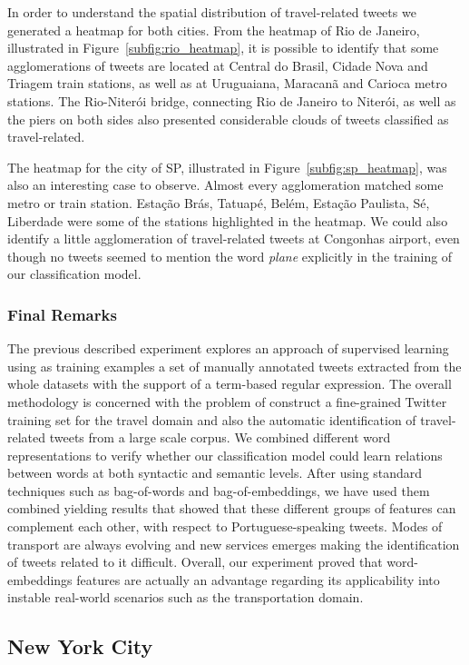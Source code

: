 In order to understand the spatial distribution of travel-related tweets we generated a heatmap for both cities. From the heatmap of Rio de Janeiro, illustrated in Figure~\ref{subfig:rio_heatmap}, it is possible to identify that some agglomerations of tweets are located at Central do Brasil, Cidade Nova and Triagem train stations, as well as at Uruguaiana, Maracanã and Carioca metro stations. The Rio-Niterói bridge, connecting Rio de Janeiro to Niterói, as well as the piers on both sides also presented considerable clouds of tweets classified as travel-related.

The heatmap for the city of SP, illustrated in Figure~\ref{subfig:sp_heatmap}, was also an interesting case to observe. Almost every agglomeration matched some metro or train station. Estação Brás, Tatuapé, Belém, Estação Paulista, Sé, Liberdade were some of the stations highlighted in the heatmap. We could also identify a little agglomeration of travel-related tweets at Congonhas airport, even though no tweets seemed to mention the word \textit{plane} explicitly in the training of our classification model.

\subsubsection{Final Remarks}
The previous described experiment explores an approach of supervised learning using as training examples a set of manually annotated tweets extracted from the whole datasets with the support of a term-based regular expression. The overall methodology is concerned with the problem of construct a fine-grained Twitter training set for the travel domain and also the automatic identification of travel-related tweets from a large scale corpus. We combined different word representations to verify whether our classification model could learn relations between words at both syntactic and semantic levels. After using standard techniques such as bag-of-words and bag-of-embeddings, we have used them combined yielding results that showed that these different groups of features can complement each other, with respect to Portuguese-speaking tweets. Modes of transport are always evolving and new services emerges making the identification of tweets related to it difficult. Overall, our experiment proved that word-embeddings features are actually an advantage regarding its applicability into instable real-world scenarios such as the transportation domain. 

\subsection{New York City}
\label{subsec:new_york_city_experiment}

